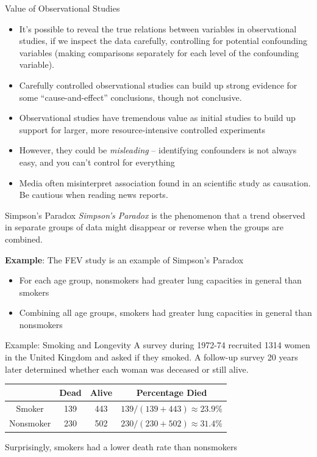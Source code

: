 \documentclass[
  ignorenonframetext,
]{beamer}
\providecommand{\tightlist}{%
  \setlength{\itemsep}{0pt}\setlength{\parskip}{0pt}}
\newcommand{\red}[1]{\textit{\textcolor{rubineRed}{#1}}}
\newcommand{\hl}[1]{\textit{\textcolor{hlblue}{#1}}}
\begin{document}
\begin{frame}{Value of Observational Studies}
\protect\hypertarget{value-of-observational-studies}{}
\begin{itemize}[<+->]
\tightlist
\item
  It's possible to reveal the true relations between variables in
  observational studies, if we inspect the data carefully, controlling
  for potential confounding variables (making comparisons separately for
  each level of the confounding variable).
\item
  Carefully controlled observational studies can build up strong
  evidence for some ``cause-and-effect'' conclusions, though not
  conclusive.
\item
  Observational studies have tremendous value as initial studies to
  build up support for larger, more resource-intensive controlled
  experiments
\item
  However, they could be \hl{misleading} -- identifying confounders is
  not always easy, and you can't control for everything
\item
  Media often misinterpret association found in an scientific study as
  causation. Be cautious when reading news reports.
\end{itemize}
\end{frame}

\begin{frame}{Simpson's Paradox}
\protect\hypertarget{simpsons-paradox}{}
\red{Simpson's Paradox} is the phenomenon that a trend observed in
separate groups of data \alert{might} disappear or reverse when the
groups are combined.

\textbf{Example}: The FEV study is an example of Simpson's Paradox

\begin{itemize}
\tightlist
\item
  For each age group, nonsmokers had greater lung capacities in general
  than smokers
\item
  Combining all age groups, smokers had greater lung capacities in
  general than nonsmokers
\end{itemize}
\end{frame}

\begin{frame}{Example: Smoking and Longevity}
\protect\hypertarget{example-smoking-and-longevity}{}
A survey during 1972-74 recruited 1314 women in the United Kingdom and
asked if they smoked. A follow-up survey 20 years later determined
whether each woman was deceased or still alive.

\begin{center}
\begin{tabular}{@{}cccc@{}}
& Dead & Alive & Percentage Died\\\hline
Smoker    & 139 & 443 & $139/(139 + 443)\approx23.9\%$ \\
Nonsmoker & 230 & 502 & $230/(230 + 502)\approx31.4\%$\\\hline
\end{tabular}
\end{center}
\medskip

Surprisingly, smokers had a lower death rate than nonsmokers
\end{frame}
\end{document}
